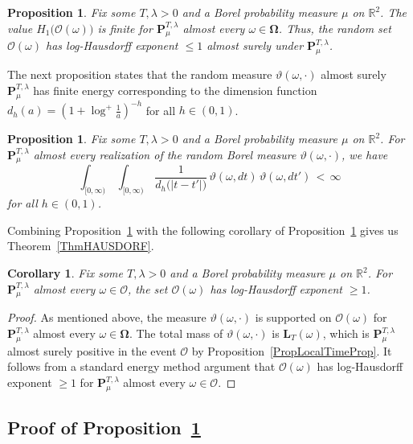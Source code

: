 \documentclass[10pt]{article}
\numberwithin{equation}{section}
\newtheorem{corollary}[theorem]{Corollary}
\newtheorem{proposition}[theorem]{Proposition}
\theoremstyle{definition}
\newcommand{\R}{{\mathbb R}}
\begin{document}
\begin{proposition}\label{PropHausdorfupperBound} Fix some $T,\lambda>0$ and a Borel probability measure $\mu$ on $\R^2$. The value   $H_{1}\big(\mathscr{O}(\omega) \big)$ is finite for  $\mathbf{P}_{\mu}^{T,\lambda}$ almost every  $\omega\in \boldsymbol{\Omega} $.  Thus, the random  set $\mathscr{O}(\omega)$  has  log-Hausdorff exponent $\leq 1$ almost surely under $\mathbf{P}_{\mu}^{T,\lambda}$.
\end{proposition}
The next proposition states that  the random measure  $\vartheta(\omega,\cdot)$ almost surely  $\mathbf{P}_{\mu }^{T,\lambda}$ has finite energy 
corresponding to the dimension function $d_h(a)=(1+\log^+\frac{1}{a})^{-h}     $  for all $h\in (0,1)$.  
\begin{proposition}\label{PropHausdorflowerBound}  Fix some $T,\lambda>0$ and a Borel probability measure $\mu$ on $\R^2$.
  For $\mathbf{P}_{\mu }^{T,\lambda}$ almost every realization of the random  Borel measure $\vartheta(\omega,\cdot)$, we have
$$ \int_{[0,\infty)}\, \int_{[0,\infty)} \,\frac{1}{d_{h}\big(|t-t'|\big)} \,\vartheta(\omega, dt)\,\vartheta(\omega, dt') \,<\, \infty $$
for all $h\in (0,1)$.  
\end{proposition}
Combining Proposition~\ref{PropHausdorfupperBound} with the following corollary of Proposition~\ref{PropHausdorflowerBound} gives us Theorem~\ref{ThmHAUSDORF}.
\begin{corollary}\label{CorollaryHausdorflowerBound} Fix some $T,\lambda>0$ and a Borel probability measure $\mu$ on $\R^2$.  For $\mathbf{P}_{\mu}^{T,\lambda}$ almost every $\omega\in \mathcal{O}$, the set $\mathscr{O}(\omega)$ has log-Hausdorff exponent $\geq 1$.
\end{corollary}
\begin{proof} As mentioned above, the measure  $\vartheta(\omega,\cdot)$ is supported on $\mathscr{O}(\omega)$ for  $\mathbf{P}_{\mu}^{T,\lambda}$ almost every $\omega\in \boldsymbol{\Omega}$.  The total mass of $\vartheta(\omega,\cdot)$ is $\mathbf{L}_{T}(\omega)$, which is $\mathbf{P}_{\mu}^{T,\lambda}$ almost surely positive in the event $\mathcal{O}$ by  Proposition~\ref{PropLocalTimeProp}.  It follows from a standard energy method argument that $\mathscr{O}(\omega)$  has  log-Hausdorff exponent $\geq 1$ for  $\mathbf{P}_{\mu}^{T,\lambda}$ almost every $\omega\in \mathcal{O}$.
\end{proof}




\subsection{Proof of Proposition~\ref{PropHausdorfupperBound}}
\end{document}
